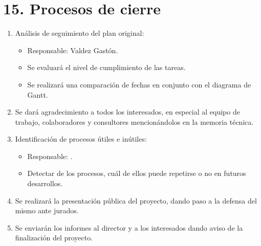 \documentclass[
11pt, %
]{charter}
\begin{document}
\section{15. Procesos de cierre}    
\label{sec:cierre}
\begin{enumerate}
	\item Análisis de seguimiento del plan original: 
	\begin{itemize}
		\item Responsable: Valdez Gastón.
		\item Se evaluará el nivel de cumplimiento de las tareas.
		\item Se realizará una comparación de fechas en conjunto con el diagrama de Gantt. 

	\end{itemize}
	\item Se dará agradecimiento a todos los interesados, en especial al equipo de trabajo, colaboradores y consultores mencionándolos en la memoria técnica.
	\item Identificación de procesos útiles e inútiles: 
	\begin{itemize}
		\item Responsable: \supname.
		\item Detectar de los procesos, cuál de ellos puede repetirse o no en futuros desarrollos.
	\end{itemize}
	\item Se realizará la presentación pública del proyecto, dando paso a la defensa del mismo ante
jurados.
	\item Se enviarán los informes al director y a los interesados dando aviso de la finalización del proyecto.
	

\end{enumerate}
\end{document}
